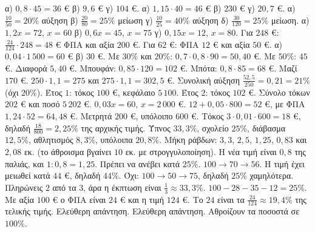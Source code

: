  α) $0{,}8\cdot45=36$ € \quad β) $9{,}6$ € \quad γ) $104$ €.
 α) $1{,}15\cdot40=46$ € \quad β) $230$ € \quad γ) $20{,}7$ €.
 α) $\frac{10}{50}=20\%$ αύξηση \quad β) $\frac{20}{80}=25\%$ μείωση \quad γ) $\frac{10}{25}=40\%$ αύξηση \quad δ) $\frac{30}{120}=25\%$ μείωση.
 α) $1{,}2x=72$, $x=60$ \quad β) $0{,}6x=45$, $x=75$ \quad γ) $0{,}15x=12$, $x=80$.
 Για $248$ €: $\frac{24}{124}\cdot248=48$ € ΦΠΑ και αξία $200$ €. Για $62$ €: ΦΠΑ $12$ € και αξία $50$ €.
 α) $0{,}04\cdot1\,500=60$ € \quad β) $30$ €.
 Με $30\%$ και $20\%$: $0{,}7\cdot0{,}8\cdot90=50{,}40$ €. Με $50\%$: $45$ €. Διαφορά $5{,}40$ €.
 Μπουφάν: $0{,}85\cdot120=102$ €. Μπότα: $0{,}8\cdot85=68$ €. Μαζί $170$ €.
 $250\cdot1{,}1=275$ και $275\cdot1{,}1=302{,}5$ €. Συνολική αύξηση $\frac{52{,}5}{250}=0{,}21=21\%$ (όχι $20\%$).
 Έτος $1$: τόκος $100$ €, κεφάλαιο $5\,100$. Έτος $2$: τόκος $102$ €. Σύνολο τόκων $202$ € και ποσό $5\,202$ €.
 $0{,}03x=60$, $x=2\,000$ €.
 $12+0{,}05\cdot800=52$ €, με ΦΠΑ $1{,}24\cdot52=64{,}48$ €.
 Μετρητά $200$ €, υπόλοιπο $600$ €. Τόκος $3\cdot0{,}01\cdot600=18$ €, δηλαδή $\frac{18}{800}=2{,}25\%$ της αρχικής τιμής.
 Ύπνος $33{,}3\%$, σχολείο $25\%$, διάβασμα $12{,}5\%$, αθλητισμός $8{,}3\%$, υπόλοιπα $20{,}8\%$. Μήκη ράβδων: $3{,}3$, $2{,}5$, $1{,}25$, $0{,}83$ και $2{,}08$ εκ. (το άθροισμα βγαίνει $10$ εκ. με στρογγυλοποίηση).
 Η νέα τιμή είναι $0{,}8$ της παλιάς, και $1:0{,}8=1{,}25$. Πρέπει να ανέβει κατά $25\%$.
 $100\to70\to56$. Η τιμή έχει μειωθεί κατά $44$ €, δηλαδή $44\%$.
 Όχι: $100\to50\to75$, δηλαδή $25\%$ χαμηλότερα.
 Πληρώνεις $2$ από τα $3$, άρα η έκπτωση είναι $\frac{1}{3}\approx33{,}3\%$.
 $100-28-35-12=25\%$.
 Με αξία $100$ € ο ΦΠΑ είναι $24$ € και η τιμή $124$ €. Το $24$ είναι τα $\frac{24}{124}\approx19{,}4\%$ της τελικής τιμής.
 Ελεύθερη απάντηση.
 Ελεύθερη απάντηση. Αθροίζουν τα ποσοστά σε $100\%$.
